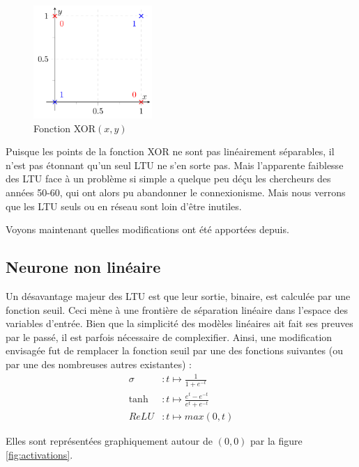 \begin{figure}[H]
\centering
\includegraphics[width=0.4\textwidth]{img/xor.png}
\caption{Fonction XOR\((x,y)\)}
\label{fig:xor}
\end{figure}

Puisque les points de la fonction XOR ne sont pas linéairement séparables, il n'est pas étonnant qu'un seul LTU ne s'en sorte pas. Mais l'apparente faiblesse des LTU face à un problème si simple a quelque peu déçu les chercheurs des années 50-60, qui ont alors pu abandonner le connexionisme. Mais nous verrons que les LTU seuls ou en réseau sont loin d'être inutiles. 

Voyons maintenant quelles modifications ont été apportées depuis.

\subsection{Neurone non linéaire}
Un désavantage majeur des LTU est que leur sortie, binaire, est calculée par une fonction seuil. Ceci mène à une frontière de séparation linéaire dans l'espace des variables d'entrée. Bien que la simplicité des modèles linéaires ait fait ses preuves par le passé, il est parfois nécessaire de complexifier. Ainsi, une modification envisagée fut de remplacer la fonction seuil par une des fonctions suivantes (ou par une des nombreuses autres existantes) : 
\begin{align}
\sigma &: t \mapsto \frac{1}{1 + e^{-t}}\\
\tanh &: t \mapsto \frac{e^t - e^{-t}}{e^t + e^{-t}}\\
\mathit{ReLU} &: t \mapsto max(0, t)
\end{align}

Elles sont représentées graphiquement autour de \((0, 0)\) par la figure \ref{fig:activations}. 

